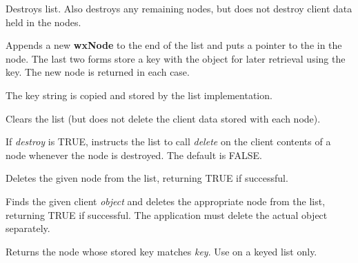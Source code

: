 
Destroys list.  Also destroys any remaining nodes, but does not destroy
client data held in the nodes.





Appends a new {\bf wxNode} to the end of the list and puts a pointer to the
 in the node.  The last two forms store a key with the object for
later retrieval using the key. The new node is returned in each case.

The key string is copied and stored by the list implementation.



Clears the list (but does not delete the client data stored with each node).



If {\it destroy} is TRUE, instructs the list to call {\it delete} on the client contents of
a node whenever the node is destroyed. The default is FALSE.



Deletes the given node from the list, returning TRUE if successful.



Finds the given client {\it object} and deletes the appropriate node from the list, returning
TRUE if successful. The application must delete the actual object separately.




Returns the node whose stored key matches {\it key}. Use on a keyed list only.

